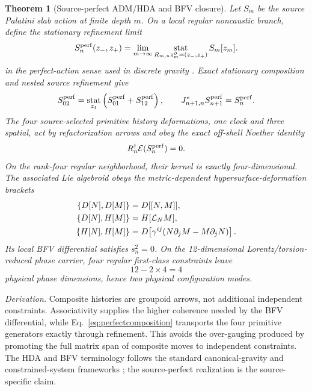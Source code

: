 \documentclass[11pt]{article}
\newtheorem{theorem}{Theorem}[section]
\theoremstyle{definition}
\theoremstyle{remark}
\newcommand{\cE}{\mathcal E}
\begin{document}
\begin{theorem}[Source-perfect ADM/HDA and BFV closure]
Let $S_m$ be the source Palatini slab action at finite depth $m$. On a local regular noncaustic branch, define the stationary refinement limit
\begin{equation}
S_n^{\rm perf}(z_-,z_+)
=\lim_{m\to\infty}
\operatorname*{stat}_{R_{m,n}z_m^{\partial}=(z_-,z_+)}S_m[z_m].
\label{eq:perfectaction}
\end{equation}
in the perfect-action sense used in discrete gravity \cite{bahrdittrich2009}.
Exact stationary composition and nested source refinement give
\begin{equation}
S_{02}^{\rm perf}
=\operatorname*{stat}_{z_1}
\left(S_{01}^{\rm perf}+S_{12}^{\rm perf}\right),
\qquad
J_{n+1,n}^{*}S_{n+1}^{\rm perf}=S_n^{\rm perf}.
\label{eq:perfectcomposition}
\end{equation}
The four source-selected primitive history deformations, one clock and three spatial, act by refactorization arrows and obey the exact off-shell Noether identity
\begin{equation}
R_n^\dagger\cE(S_n^{\rm perf})=0.
\label{eq:perfectnoether}
\end{equation}
On the rank-four regular neighborhood, their kernel is exactly four-dimensional. The associated Lie algebroid obeys the metric-dependent hypersurface-deformation brackets
\begin{align}
\{D[N],D[M]\}&=D[[N,M]],\notag\\
\{D[N],H[M]\}&=H[\mathcal L_NM],\notag\\
\{H[N],H[M]\}
&=D\!\left[\gamma^{ij}(N\partial_jM-M\partial_jN)\right].
\label{eq:hda}
\end{align}
Its local BFV differential satisfies $s_n^2=0$. On the 12-dimensional Lorentz/torsion-reduced phase carrier, four regular first-class constraints leave
\begin{equation}
12-2\times4=4
\end{equation}
physical phase dimensions, hence two physical configuration modes.
\end{theorem}

\textit{Derivation.} Composite histories are groupoid arrows, not additional independent constraints. Associativity supplies the higher coherence needed by the BFV differential, while Eq.~\eqref{eq:perfectcomposition} transports the four primitive generators exactly through refinement. This avoids the over-gauging produced by promoting the full matrix span of composite moves to independent constraints. The HDA and BFV terminology follows the standard canonical-gravity and constrained-system frameworks \cite{hkt1976,henneauxteitelboim1992}; the source-perfect realization is the source-specific claim.
\end{document}
